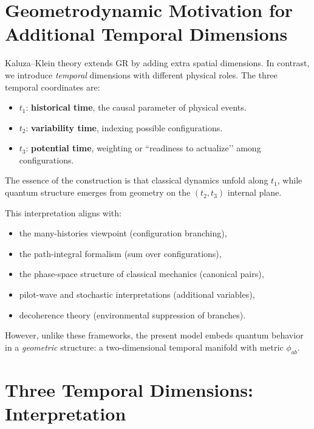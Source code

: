 \documentclass[12pt]{article}
\begin{document}

\newpage
\section{Geometrodynamic Motivation for Additional Temporal Dimensions}

Kaluza--Klein theory extends GR by adding extra spatial dimensions. In 
contrast, we introduce \emph{temporal} dimensions with different physical 
roles. The three temporal coordinates are:

\begin{itemize}
\item \(t_1\): \textbf{historical time}, the causal parameter of physical events.
\item \(t_2\): \textbf{variability time}, indexing possible configurations.
\item \(t_3\): \textbf{potential time}, weighting or “readiness to actualize’’ 
among configurations.
\end{itemize}

The essence of the construction is that classical dynamics unfold along \(t_1\), 
while quantum structure emerges from geometry on the \((t_2,t_3)\) internal 
plane.

This interpretation aligns with:
\begin{itemize}
\item the many-histories viewpoint (configuration branching),
\item the path-integral formalism (sum over configurations),
\item the phase-space structure of classical mechanics (canonical pairs),
\item pilot-wave and stochastic interpretations (additional variables),
\item decoherence theory (environmental suppression of branches).
\end{itemize}

However, unlike these frameworks, the present model embeds quantum behavior in 
a \emph{geometric} structure: a two-dimensional temporal manifold with metric 
\(\phi_{ab}\).


\newpage
\section{Three Temporal Dimensions: Interpretation}
\end{document}
